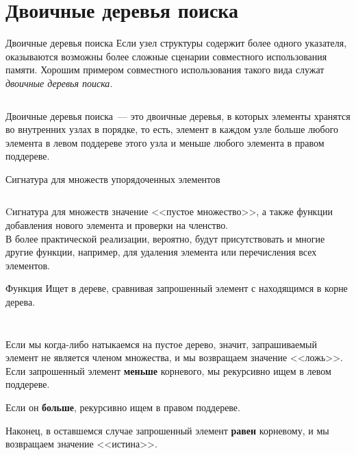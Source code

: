 \section{Двоичные деревья поиска}
\label{sc:2.2}

\begin{frame}{Двоичные деревья поиска}
Если узел структуры содержит более одного указателя, оказываются
возможны более сложные сценарии совместного использования памяти. Хорошим примером
совместного использования такого вида служат \emph{двоичные деревья поиска}.

\inputminted[firstline=10, lastline=10] {haskell}{code/SearchTree.hs}

Двоичные деревья поиска~--- это двоичные деревья, в которых элементы
хранятся во внутренних узлах в 
порядке, то есть, элемент в каждом узле больше любого элемента в
левом поддереве этого узла и меньше любого элемента в правом
поддереве.
\end{frame}

\begin{frame}[fragile]{Сигнатура для множеств упорядоченных элементов}
\begin{figure}[h]
  \centering
  \inputminted[firstline=12, lastline=15]{haskell}{code/SearchTree.hs}
\label{fig:2.7}
\end{figure}

Cигнатура для множеств значение <<пустое множество>>, а также функции добавления
нового элемента и проверки на членство. \\

 В более практической
реализации, вероятно, будут присутствовать и многие другие функции,
например, для удаления элемента или перечисления всех элементов.
\end{frame}

\begin{frame}[fragile]{Функция }
Ищет в дереве, сравнивая запрошенный элемент с находящимся в корне дерева. 
\inputminted[firstline=15, lastline=15] {haskell}{code/SearchTree.hs}
\inputminted[firstline=22, lastline=25] {haskell}{code/SearchTree.hs}


Если мы когда-либо натыкаемся на пустое дерево, значит,
запрашиваемый элемент не является членом множества, и мы возвращаем
значение <<ложь>>. \\

Если запрошенный элемент \textbf{меньше}
корневого, мы рекурсивно ищем в левом поддереве.

Если он \textbf{больше}, рекурсивно ищем в правом поддереве. 

Наконец, в оставшемся случае
запрошенный элемент \textbf{равен} корневому, и мы возвращаем значение
<<истина>>. 
\end{frame}


